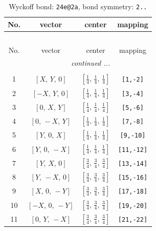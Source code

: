 \documentclass[fleqn,8pt]{jsarticle}
\begin{document}
\begin{longtable}{cccc}
\caption{Wyckoff bond: {\tt 24e@2a}, bond symmetry: {\tt 2..}}
 \\
 \hline \hline
No. & vector & center & mapping \\ \hline \endfirsthead

\multicolumn{3}{l}{\tablename\ \thetable{}} \\
 \hline \hline
No. & vector & center & mapping \\ \hline \endhead

 \hline \hline
\multicolumn{3}{r}{\footnotesize\it continued ...} \\ \endfoot

 \hline \hline
\multicolumn{3}{r}{} \\ \endlastfoot

1 & $\left[ X,\, Y,\, 0 \right]$ & $\left[ \frac{1}{4},\, \frac{1}{4},\, \frac{1}{4} \right]$ & {\tt [1,-2]} \\ \hline
2 & $\left[ - X,\, Y,\, 0 \right]$ & $\left[ \frac{1}{4},\, \frac{1}{4},\, \frac{1}{4} \right]$ & {\tt [3,-4]} \\ \hline
3 & $\left[ 0,\, X,\, Y \right]$ & $\left[ \frac{1}{4},\, \frac{1}{4},\, \frac{1}{4} \right]$ & {\tt [5,-6]} \\ \hline
4 & $\left[ 0,\, - X,\, Y \right]$ & $\left[ \frac{1}{4},\, \frac{1}{4},\, \frac{1}{4} \right]$ & {\tt [7,-8]} \\ \hline
5 & $\left[ Y,\, 0,\, X \right]$ & $\left[ \frac{1}{4},\, \frac{1}{4},\, \frac{1}{4} \right]$ & {\tt [9,-10]} \\ \hline
6 & $\left[ Y,\, 0,\, - X \right]$ & $\left[ \frac{1}{4},\, \frac{1}{4},\, \frac{1}{4} \right]$ & {\tt [11,-12]} \\ \hline
7 & $\left[ Y,\, X,\, 0 \right]$ & $\left[ \frac{3}{4},\, \frac{3}{4},\, \frac{3}{4} \right]$ & {\tt [13,-14]} \\ \hline
8 & $\left[ Y,\, - X,\, 0 \right]$ & $\left[ \frac{3}{4},\, \frac{3}{4},\, \frac{3}{4} \right]$ & {\tt [15,-16]} \\ \hline
9 & $\left[ X,\, 0,\, - Y \right]$ & $\left[ \frac{3}{4},\, \frac{3}{4},\, \frac{3}{4} \right]$ & {\tt [17,-18]} \\ \hline
10 & $\left[ - X,\, 0,\, - Y \right]$ & $\left[ \frac{3}{4},\, \frac{3}{4},\, \frac{3}{4} \right]$ & {\tt [19,-20]} \\ \hline
11 & $\left[ 0,\, Y,\, - X \right]$ & $\left[ \frac{3}{4},\, \frac{3}{4},\, \frac{3}{4} \right]$ & {\tt [21,-22]} \\ \hline

\end{longtable}
\end{document}
